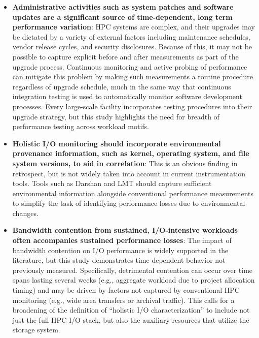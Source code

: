 \begin{itemize}[leftmargin=*]

\item \textbf{Administrative activities such as system patches and
software updates are a significant source of time-dependent, long term
performance variation}:
HPC systems are complex, and their upgrades may be dictated by a variety of external factors including maintenance schedules, vendor release cycles, and security disclosures.
Because of this, it may not be possible to capture explicit before and after measurements as part of the upgrade process.
Continuous monitoring and active probing of performance can mitigate this
problem by making such measurements a routine procedure regardless of
upgrade schedule, much in the same way that continuous integration testing
is used to automatically monitor software development processes.  Every
large-scale facility incorporates testing procedures into their upgrade
strategy, but this study highlights the need for breadth of performance
testing across workload motifs.

\item \textbf{Holistic I/O monitoring should incorporate environmental
provenance information, such as kernel, operating system, and file system versions, to aid in correlation}: 
This is an obvious finding in retrospect, but is not widely taken into
account in current instrumentation tools.
Tools such as Darshan and LMT should capture sufficient environmental information alongside conventional performance measurements to
simplify the task of identifying performance losses due to environmental changes.

\item \textbf{Bandwidth contention from sustained, I/O-intensive workloads often accompanies sustained performance losses}:
The impact of bandwidth contention on I/O performance is widely supported in the literature, but this study demonstrates time-dependent behavior not previously measured.
Specifically, detrimental contention
can occur over time spans lasting several weeks (e.g., aggregate
workload due to project allocation timing) and may be driven by factors 
not captured by conventional HPC monitoring (e.g., wide area transfers or archival traffic).
This calls for a broadening of the definition of ``holistic I/O characterization'' to include not just the full HPC I/O stack, but also the auxiliary resources that utilize the storage system.

\end{itemize}


